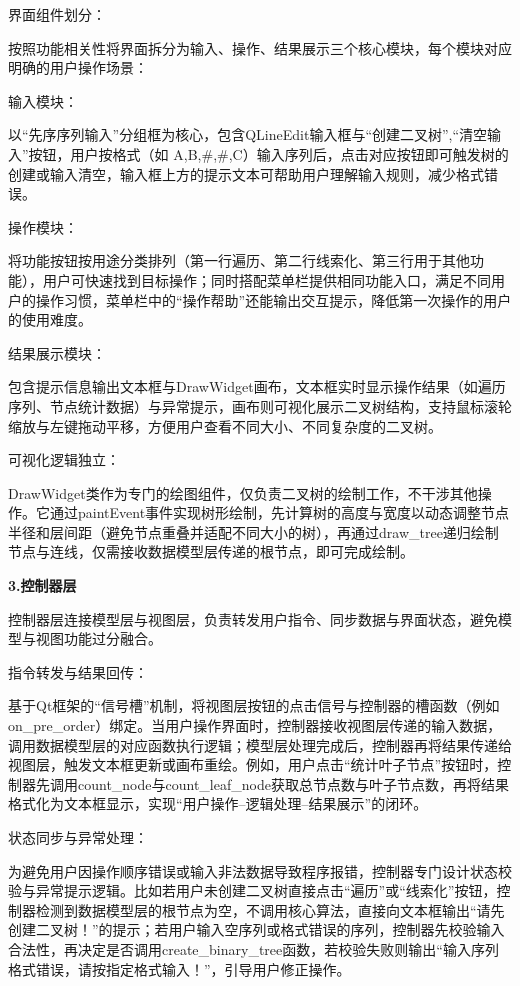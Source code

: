 \documentclass[12pt,a4paper]{article}
\begin{document}
界面组件划分：

按照功能相关性将界面拆分为输入、操作、结果展示三个核心模块，每个模块对应明确的用户操作场景：

输入模块：

以“先序序列输入”分组框为核心，包含QLineEdit输入框与“创建二叉树”,“清空输入”按钮，用户按格式（如 A,B,\#,\#,C）输入序列后，点击对应按钮即可触发树的创建或输入清空，输入框上方的提示文本可帮助用户理解输入规则，减少格式错误。

操作模块：

将功能按钮按用途分类排列（第一行遍历、第二行线索化、第三行用于其他功能），用户可快速找到目标操作；同时搭配菜单栏提供相同功能入口，满足不同用户的操作习惯，菜单栏中的“操作帮助”还能输出交互提示，降低第一次操作的用户的使用难度。

结果展示模块：

包含提示信息输出文本框与DrawWidget画布，文本框实时显示操作结果（如遍历序列、节点统计数据）与异常提示，画布则可视化展示二叉树结构，支持鼠标滚轮缩放与左键拖动平移，方便用户查看不同大小、不同复杂度的二叉树。

可视化逻辑独立：

DrawWidget类作为专门的绘图组件，仅负责二叉树的绘制工作，不干涉其他操作。它通过paintEvent事件实现树形绘制，先计算树的高度与宽度以动态调整节点半径和层间距（避免节点重叠并适配不同大小的树），再通过draw\_tree递归绘制节点与连线，仅需接收数据模型层传递的根节点，即可完成绘制。

\noindent\textbf {3.控制器层}

控制器层连接模型层与视图层，负责转发用户指令、同步数据与界面状态，避免模型与视图功能过分融合。

指令转发与结果回传：

基于Qt框架的“信号槽”机制，将视图层按钮的点击信号与控制器的槽函数（例如on\_pre\_order）绑定。当用户操作界面时，控制器接收视图层传递的输入数据，调用数据模型层的对应函数执行逻辑；模型层处理完成后，控制器再将结果传递给视图层，触发文本框更新或画布重绘。例如，用户点击“统计叶子节点”按钮时，控制器先调用count\_node与count\_leaf\_node获取总节点数与叶子节点数，再将结果格式化为文本框显示，实现“用户操作--逻辑处理--结果展示”的闭环。

状态同步与异常处理：

为避免用户因操作顺序错误或输入非法数据导致程序报错，控制器专门设计状态校验与异常提示逻辑。比如若用户未创建二叉树直接点击“遍历”或“线索化”按钮，控制器检测到数据模型层的根节点为空，不调用核心算法，直接向文本框输出“请先创建二叉树！”的提示；若用户输入空序列或格式错误的序列，控制器先校验输入合法性，再决定是否调用create\_binary\_tree函数，若校验失败则输出“输入序列格式错误，请按指定格式输入！”，引导用户修正操作。
\end{document}
